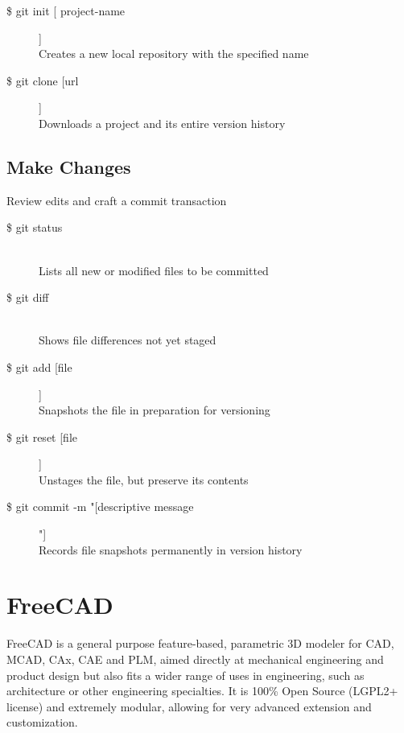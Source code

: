 \begin{description}

\item [\$ git init [ project-name]]\\
Creates a new local repository with the specified name
\item [\$ git clone [url]]\\
Downloads a project and its entire version history

\end{description}


\subsection*{Make Changes}
Review edits and craft a commit transaction

\begin{description}

\item [\$ git status] \leavevmode \\
Lists all new or modified files to be committed

\item [\$ git diff] \leavevmode \\
Shows file differences not yet staged

\item [\$ git add [file]]\\
Snapshots the file in preparation for versioning

\item [\$ git reset [file]]\\
Unstages the file, but preserve its contents

\item [\$ git commit -m "[descriptive message]"]\\
Records file snapshots permanently in version history

\end{description}

\section{FreeCAD}
FreeCAD is a general purpose feature-based, parametric 3D modeler for CAD, MCAD, CAx, CAE and PLM, aimed directly at mechanical engineering and product design but also fits a wider range of uses in engineering, such as architecture or other engineering specialties. It is 100\% Open Source (LGPL2+ license) and extremely modular, allowing for very advanced extension and customization.

